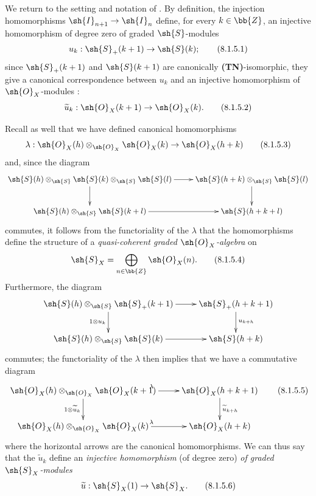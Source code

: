 \begin{env}[8.1.5]
\label{II.8.1.5}
We return to the setting and notation of .
By definition, the injection homomorphisms $\sh{I}_{n+1}\to\sh{I}_n$  define, for every $k\in\bb{Z}$, an injective homomorphism of degree zero of graded $\sh{S}$-modules
\[
\label{II.8.1.5.1}
  u_k: \sh{S}_+(k+1) \to \sh{S}(k);
\tag{8.1.5.1}
\]
since $\sh{S}_+(k+1)$ and $\sh{S}(k+1)$ are canonically \textbf{(TN)}-isomorphic, they give a canonical correspondence between $u_k$ and an injective homomorphism of $\sh{O}_X$-modules :
\[
\label{II.8.1.5.2}
  \widetilde{u}_k: \sh{O}_X(k+1) \to \sh{O}_X(k).
\tag{8.1.5.2}
\]

Recall as well  that we have defined canonical homomorphisms
\[
\label{II.8.1.5.3}
  \lambda: \sh{O}_X(h) \otimes_{\sh{O}_X} \sh{O}_X(k) \to \sh{O}_X(h+k)
\tag{8.1.5.3}
\]
and, since the diagram
\[
  \xymatrix{
    \sh{S}(h) \otimes_{\sh{S}} \sh{S}(k) \otimes_{\sh{S}} \sh{S}(l)
      \ar[r]
      \ar[d]
  & \sh{S}(h+k) \otimes_{\sh{S}} \sh{S}(l)
      \ar[d]
  \\\sh{S}(h) \otimes_{\sh{S}} \sh{S}(k+l)
      \ar[r]
  & \sh{S}(h+k+l)
  }
\]
commutes, it follows from the functoriality of the $\lambda$  that the homomorphisms  define the structure of a \emph{quasi-coherent graded $\sh{O}_X$-algebra} on
\[
\label{II.8.1.5.4}
  \sh{S}_X = \bigoplus_{n\in\bb{Z}}\sh{O}_X(n).
\tag{8.1.5.4}
\]
Furthermore, the diagram
\[
  \xymatrix{
    \sh{S}(h) \otimes_{\sh{S}} \sh{S}_+(k+1)
      \ar[r]
      \ar[d]_{1\otimes u_k}
  & \sh{S}_+(h+k+1)
      \ar[d]^{u_{k+h}}
  \\\sh{S}(h) \otimes_{\sh{S}} \sh{S}(k)
      \ar[r]
  & \sh{S}(h+k)
  }
\]
commutes; the functoriality of the $\lambda$ then implies that we have a commutative diagram
\[
\label{II.8.1.5.5}
  \xymatrix{
    \sh{O}_X(h) \otimes_{\sh{O}_X} \sh{O}_X(k+1)
      \ar[r]^{\lambda}
      \ar[d]_{1\otimes \widetilde{u}_k}
  & \sh{O}_X(h+k+1)
      \ar[d]^{\widetilde{u}_{k+h}}
  \\\sh{O}_X(h) \otimes_{\sh{O}_X} \sh{O}_X(k)
      \ar[r]^{\lambda}
  & \sh{O}_X(h+k)
  }
\tag{8.1.5.5}
\]
where the horizontal arrows are the canonical homomorphisms.
We can thus say that the $\widetilde{u}_k$ define an \emph{injective homomorphism} (of degree zero) \emph{of graded $\sh{S}_X$-modules}
\[
\label{II.8.1.5.6}
  \widetilde{u}: \sh{S}_X(1) \to \sh{S}_X.
\tag{8.1.5.6}
\]
\end{env}

